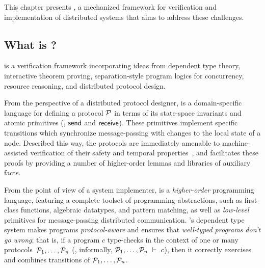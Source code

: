 



\noindent
%
This chapter presents \disel, a mechanized framework for
verification and implementation of distributed systems that aims to
address these challenges.

\subsection{What is \disel?}
\label{sec:wtf-disel}

\disel is a verification framework incorporating ideas from dependent
type theory, interactive theorem proving, separation-style program
logics for concurrency, resource reasoning, and distributed protocol
design.

From the perspective of a distributed protocol designer, \disel is a
domain-specific language for defining a protocol $\mathcal{P}$ in terms of
its state-space invariants and atomic primitives (\eg, $\mathsf{send}$ and
$\mathsf{receive}$). These primitives implement specific transitions which
synchronize message-passing with changes to the local state of a
node. Described this way, the protocols are immediately amenable to
machine-assisted verification of their safety and temporal
properties~\cite{Wilcox-al:PLDI15,rahli:eventml-avocs}, and \disel
facilitates these proofs by providing a number of higher-order lemmas
and libraries of auxiliary facts.

From the point of view of a system implementer, \disel is a
\emph{higher-order} programming language, featuring a complete toolset
of programming abstractions, such as first-class functions, algebraic
datatypes, and pattern matching, as well as \emph{low-level}
primitives for message-passing distributed communication. \disel's
dependent type system makes programs \emph{protocol-aware} and ensures
that \emph{well-typed programs don't go wrong}; that is, if a program
$c$ type-checks in the context of one or many
protocols~$\mathcal{P}_1, \ldots, \mathcal{P}_n$ (\ie, informally,
$\mathcal{P}_1, \ldots, \mathcal{P}_n~\vdash~c$), then it correctly exercises and
combines transitions of $\mathcal{P}_1, \ldots, \mathcal{P}_n$.

